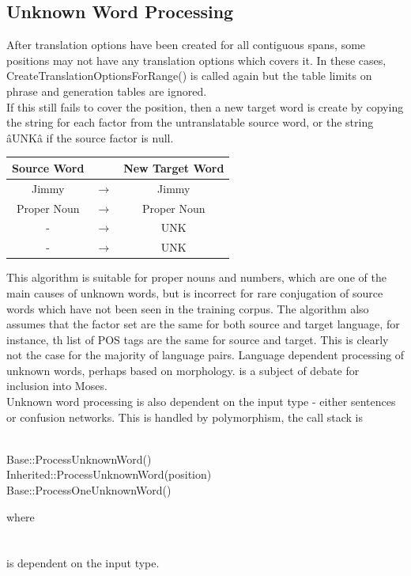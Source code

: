 \documentclass[10pt]{report}
\theoremstyle{plain}
\begin{document}
{\subsection{Unknown Word Processing}
After translation options have been created for all contiguous spans, some positions may not have any translation options which covers it. In these cases, CreateTranslationOptionsForRange() is called again but the table limits on phrase and generation tables are ignored. \\
If this still fails to cover the position, then a new target word is create by copying the string for each factor from the untranslatable source word, or the string âUNKâ if the source factor is null.\\
\begin{center}
\begin{tabular}{|c|c|c|}
\hline
Source Word & & New Target Word \\ \hline
Jimmy	& 	$\to$	& Jimmy\\
Proper Noun	& $\to$	& Proper Noun\\
-	& $\to$	& UNK\\
-	& $\to$	& UNK\\ \hline
\end{tabular}
\end{center}

This algorithm is suitable for proper nouns and numbers, which are one of the main causes of unknown words, but is incorrect for rare conjugation of source words which have not been seen in the training corpus. The algorithm also assumes that the factor set are the same for both source and target language, for instance, th list of POS tags are the same for source and target. This is clearly not the case for the majority of language pairs. Language dependent processing of unknown words, perhaps based on morphology. is a subject of debate for inclusion into Moses.\\
Unknown word processing is also dependent on the input type - either sentences or confusion networks. This is handled by polymorphism, the call stack is\\
\\
\begin{tt}
\indent	Base::ProcessUnknownWord()\\
\indent \indent	Inherited::ProcessUnknownWord(position)\\
\indent \indent \indent	Base::ProcessOneUnknownWord()\\
\end{tt}
where\\
\\
\\
is dependent on the input type.
}
\end{document}

